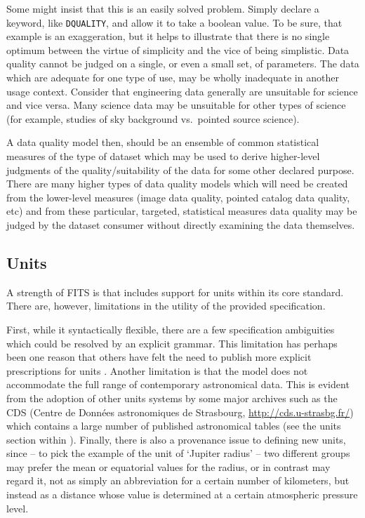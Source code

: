 \documentclass[final,authoryear,5p,times,twocolumn]{elsarticle}
\begin{document}
{{Some might insist that this is an easily solved problem. Simply
declare a keyword, like \texttt{DQUALITY}, and allow it to take a boolean
value. To be sure, that example is an exaggeration, but it helps to
illustrate that there is no single optimum between the virtue of
simplicity and the vice of being simplistic.
Data quality cannot be judged on a single, or even a
small set, of parameters. The
data which are adequate for one type of use, may be wholly inadequate
in another usage context. Consider that engineering data generally are
unsuitable for science and vice versa. Many science data may be
unsuitable for other types of science (for example, studies of sky
background vs.\ pointed source science).


A data quality model then, should be an ensemble of common statistical
measures of the type of dataset which may be used to derive
higher-level judgments of the quality/suitability of the data for
some other declared purpose. There are many higher types of data
quality models which will need be created from the lower-level
measures (image data quality, pointed catalog data quality, etc) and
from these particular, targeted, statistical measures data quality may
be judged by the dataset consumer without directly examining the data
themselves.


\subsection{Units}
\label{sec_units}

A strength of FITS is that includes support for units within its core
standard. There are, however, limitations in the utility of the provided
specification.

First, while it syntactically flexible, there are a few
specification ambiguities which could be resolved by an explicit grammar.  
This limitation has perhaps been one reason that others
have felt the need to publish more explicit prescriptions for units
\citep{1995OGIPUnits}.  Another limitation is that the model does   
not accommodate the full range of contemporary astronomical data. This
is evident from the adoption of other units systems by some major
archives such as the CDS (Centre de Données astronomiques de Strasbourg,
\url{http://cds.u-strasbg.fr/}) which contains a large number of published 
astronomical tables (see the units section within \citealt{2000CDSUnits}).  
Finally, there is also a provenance issue to defining new units, since 
-- to pick the example of
the unit of `Jupiter radius' -- two different groups may prefer the
mean or equatorial values for the radius, or in contrast may regard it,
not as simply an abbreviation for a certain number of
kilometers, but instead as a distance whose value is determined at a
certain atmospheric pressure level.

}}
\end{document}
